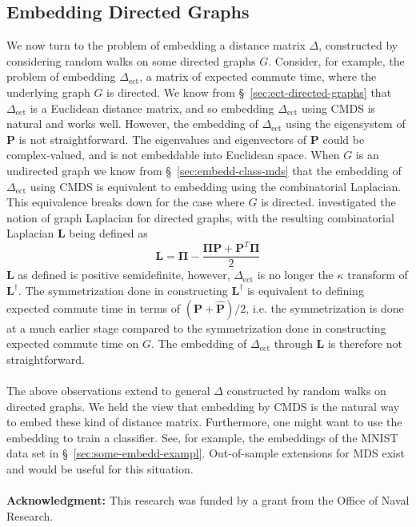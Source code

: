 \documentclass[10pt,twocolumn]{article}
\numberwithin{equation}{section}
\begin{document}
\subsection{Embedding Directed Graphs}
\label{sec:embedd-dist-direct}
We now turn to the problem of embedding a distance matrix $\Delta$,
constructed by considering random walks on some directed graphs
$G$. Consider, for example, the problem of embedding $\Delta_{\mathrm{ect}}$,
a matrix of expected commute time, where the underlying graph $G$ is
directed. We know from \S~\ref{sec:ect-directed-graphs} that
$\Delta_{\mathrm{ect}}$ is a Euclidean distance matrix, and so embedding
$\Delta_{\mathrm{ect}}$ using CMDS is natural and works
well. However, the embedding of $\Delta_{\mathrm{ect}}$ using the eigensystem
of $\mathbf{P}$ is not straightforward. The eigenvalues and
eigenvectors of $\mathbf{P}$ could be complex-valued, and is not
embeddable into Euclidean space. When $G$ is an undirected graph we
know from \S~\ref{sec:embedd-class-mds} that the
embedding of $\Delta_{\mathrm{ect}}$ using CMDS is equivalent to
embedding using the combinatorial Laplacian. This equivalence breaks
down for the case where $G$ is directed. \cite{chung05:_laplac_cheeg}
investigated the notion of graph Laplacian for directed graphs, with the
resulting combinatorial Laplacian $\mathbf{L}$ being defined as
\begin{equation}
  \label{eq:31}
  \mathbf{L} = \bm{\Pi} - \frac{\bm{\Pi}\mathbf{P} + \mathbf{P}^{T}\bm{\Pi}}{2}
\end{equation}
$\mathbf{L}$ as defined is positive semidefinite, however,
$\Delta_{\mathrm{ect}}$ is no longer the $\kappa$ transform of
$\mathbf{L}^{\dagger}$. The symmetrization done in
constructing $\mathbf{L}^{\dagger}$ is equivalent to defining 
expected commute time in terms of $(\mathbf{P} + \hat{\mathbf{P}})/2$,
i.e. the symmetrization is done at a much earlier stage compared to
the symmetrization done in constructing expected commute time on $G$.
The embedding of $\Delta_{\mathrm{ect}}$ through
$\mathbf{L}$ is therefore not straightforward. \\ \\
%
\noindent
The above observations extend to general $\Delta$ constructed by
random walks on directed graphs. We held the view that embedding by
CMDS is the natural way to embed these kind of distance
matrix. Furthermore, one might want to use the embedding to train a
classifier. See, for example, the embeddings of the MNIST data set in
\S~\ref{sec:some-embedd-exampl}. Out-of-sample extensions for MDS
exist and would be useful for this situation. \\ \\
%
\noindent
{\bf Acknowledgment:} This research was funded by a grant from the
Office of Naval Research.
\appendix
\end{document}
